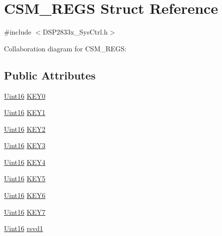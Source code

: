 \hypertarget{struct_c_s_m___r_e_g_s}{}\section{C\+S\+M\+\_\+\+R\+E\+G\+S Struct Reference}
\label{struct_c_s_m___r_e_g_s}


{\ttfamily \#include $<$D\+S\+P2833x\+\_\+\+Sys\+Ctrl.\+h$>$}



Collaboration diagram for C\+S\+M\+\_\+\+R\+E\+G\+S\+:
\subsection*{Public Attributes}
\begin{DoxyCompactItemize}
\item 
\hyperlink{_d_s_p2833x___device_8h_a59a9f6be4562c327cbfb4f7e8e18f08b}{Uint16} \hyperlink{struct_c_s_m___r_e_g_s_a7e06a87597063e7639e0d9594b64a815}{K\+E\+Y0}
\item 
\hyperlink{_d_s_p2833x___device_8h_a59a9f6be4562c327cbfb4f7e8e18f08b}{Uint16} \hyperlink{struct_c_s_m___r_e_g_s_ad30fde77f060f4f690c010e011479855}{K\+E\+Y1}
\item 
\hyperlink{_d_s_p2833x___device_8h_a59a9f6be4562c327cbfb4f7e8e18f08b}{Uint16} \hyperlink{struct_c_s_m___r_e_g_s_a66ce0b5b350b5ef634917e77a33d33ba}{K\+E\+Y2}
\item 
\hyperlink{_d_s_p2833x___device_8h_a59a9f6be4562c327cbfb4f7e8e18f08b}{Uint16} \hyperlink{struct_c_s_m___r_e_g_s_a8ee53df67d4b8800b17abbec51631dfc}{K\+E\+Y3}
\item 
\hyperlink{_d_s_p2833x___device_8h_a59a9f6be4562c327cbfb4f7e8e18f08b}{Uint16} \hyperlink{struct_c_s_m___r_e_g_s_ae15274359fc1e12c28362089732012a0}{K\+E\+Y4}
\item 
\hyperlink{_d_s_p2833x___device_8h_a59a9f6be4562c327cbfb4f7e8e18f08b}{Uint16} \hyperlink{struct_c_s_m___r_e_g_s_a56af8aa2b4eeaf318b71a449f26bf663}{K\+E\+Y5}
\item 
\hyperlink{_d_s_p2833x___device_8h_a59a9f6be4562c327cbfb4f7e8e18f08b}{Uint16} \hyperlink{struct_c_s_m___r_e_g_s_ac759c33046c4fd9fc61f746de092c078}{K\+E\+Y6}
\item 
\hyperlink{_d_s_p2833x___device_8h_a59a9f6be4562c327cbfb4f7e8e18f08b}{Uint16} \hyperlink{struct_c_s_m___r_e_g_s_a7484c680a52621bb3796eae8bd80e7f0}{K\+E\+Y7}
\item 
\hyperlink{_d_s_p2833x___device_8h_a59a9f6be4562c327cbfb4f7e8e18f08b}{Uint16} \hyperlink{struct_c_s_m___r_e_g_s_a73fdc3c764412fd753d6dcbd80fa072b}{rsvd1}

\end{DoxyCompactItemize}
